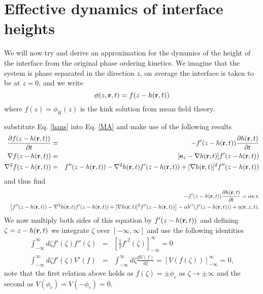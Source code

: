 \documentclass[11pt]{report}
\begin{document}
\section{Effective dynamics of interface heights}
We will now try and derive an approximation for the dynamics of the  height of the interface from the original phase ordering kinetics. We imagine that the system is phase separated in the direction  $z$, on average the interface is taken to be at $z=0$, and we write
\begin{equation}
\phi(z,{\bf r},t) = f(z-h({\bf r},t))\label{hans}
\end{equation}
where $f(z)=\phi_K(z)$ is the kink solution from mean field theory.
\\


substitute Eq. \eqref{hans} into Eq. \eqref{MA} and make use of the following results
\begin{eqnarray}
\frac{\partial f(z-h({\bf r},t))}{\partial t}&=& -f'(z-h({\bf r},t))\frac{\partial h({\bf r},t)}{\partial t}\\
\nabla f(z-h({\bf r},t))&=& [{\bf e}_z-\nabla h({\bf r},t)]f'(z-h({\bf r},t))  \\
\nabla^2 f(z-h({\bf r},t))&=& f''(z-h({\bf r},t))- \nabla^2 h({\bf r},t)f'(z-h({\bf r},t))+ [\nabla h({\bf r},t)]^2 
f''(z-h({\bf r},t))
\end{eqnarray}
and thus find
\begin{eqnarray}
&&-f'(z-h({\bf r},t))\frac{\partial h({\bf r},t)}{\partial t}= \alpha\kappa\times\\ &&\left[f''(z-h({\bf r},t))- \nabla^2 h({\bf r},t)f'(z-h({\bf r},t))+ [\nabla h({\bf r},t)]^2 
f''(z-h({\bf r},t))\right] - \alpha V'(f'(z-h({\bf r},t))) + \eta({\bf r},z,t).
\end{eqnarray}
We now multiply both sides of this equation by $f'(z-h({\bf r},t))$ and defining $\zeta=z-h({\bf r},t)$ we integrate  $\zeta$ over $[-\infty,\infty]$ and use the following identities
\begin{eqnarray}
\int_{-\infty}^\infty d\zeta f'(\zeta)f''(\zeta) &=& [\frac{1}{2}f'^2(\zeta)]_{-\infty}^\infty =0\\
\int_{-\infty}^\infty d\zeta f'(\zeta) V'(f) &=& \int_{-\infty}^\infty d\zeta\frac{d V(f)}{d\zeta}= [V(f(\zeta))]_{-\infty}^\infty=0,
\end{eqnarray} 
note that the first relation above holds as $f(\zeta)=\pm \phi_c$ as $\zeta\to\pm \infty$ and the second as
$V(\phi_c)=V(-\phi_c)=0$.
\end{document}
